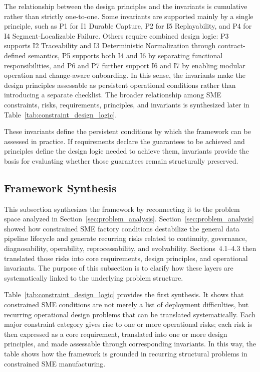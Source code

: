 \documentclass[systems,article,submit,pdftex,moreauthors]{Definitions/mdpi}
\begin{document}
The relationship between the design principles and the invariants is cumulative rather than strictly one-to-one. Some invariants are supported mainly by a single principle, such as P1 for I1 Durable Capture, P2 for I5 Replayability, and P4 for I4 Segment-Localizable Failure. Others require combined design logic: P3 supports I2 Traceability and I3 Deterministic Normalization through contract-defined semantics, P5 supports both I4 and I6 by separating functional responsibilities, and P6 and P7 further support I6 and I7 by enabling modular operation and change-aware onboarding. In this sense, the invariants make the design principles assessable as persistent operational conditions rather than introducing a separate checklist. The broader relationship among SME constraints, risks, requirements, principles, and invariants is synthesized later in Table~\ref{tab:constraint_design_logic}.

These invariants define the persistent conditions by which the framework can be assessed in practice. If requirements declare the guarantees to be achieved and principles define the design logic needed to achieve them, invariants provide the basis for evaluating whether those guarantees remain structurally preserved.

\subsection{Framework Synthesis}
\label{sec:framework_synthesis}

This subsection synthesizes the framework by reconnecting it to the problem space analyzed in Section~\ref{sec:problem_analysis}. Section~\ref{sec:problem_analysis} showed how constrained SME factory conditions destabilize the general data pipeline lifecycle and generate recurring risks related to continuity, governance, diagnosability, operability, reprocessability, and evolvability. Sections~4.1--4.3 then translated those risks into core requirements, design principles, and operational invariants. The purpose of this subsection is to clarify how these layers are systematically linked to the underlying problem structure.

Table~\ref{tab:constraint_design_logic} provides the first synthesis. It shows that constrained SME conditions are not merely a list of deployment difficulties, but recurring operational design problems that can be translated systematically. Each major constraint category gives rise to one or more operational risks; each risk is then expressed as a core requirement, translated into one or more design principles, and made assessable through corresponding invariants. In this way, the table shows how the framework is grounded in recurring structural problems in constrained SME manufacturing.
\end{document}
